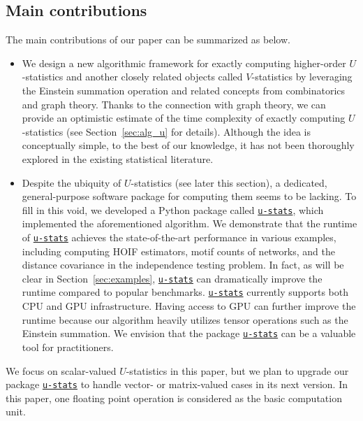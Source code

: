 \documentclass[twoside,11pt]{article}
\newcommand{\libref}[2]{\href{#2}{\texttt{#1}}}
\def\package{\libref{u-stats}{https://github.com/zrq1706/U-Statistics-python}}
\begin{document}
\subsection*{Main contributions}

The main contributions of our paper can be summarized as below.

\begin{itemize}
\item We design a new algorithmic framework for exactly computing higher-order $U$-statistics and another closely related objects called $V$-statistics by leveraging the Einstein summation operation and related concepts from combinatorics and graph theory. Thanks to the connection with graph theory, we can provide an optimistic estimate of the time complexity of exactly computing $U$-statistics (see Section~\ref{sec:alg_u} for details). Although the idea is conceptually simple, to the best of our knowledge, it has not been thoroughly explored in the existing statistical literature.

\item Despite the ubiquity of $U$-statistics (see later this section), a dedicated, general-purpose software package for computing them seems to be lacking. To fill in this void, we developed a Python package called \package{}, which implemented the aforementioned algorithm. We demonstrate that the runtime of \package{} achieves the state-of-the-art performance in various examples, including computing HOIF estimators, motif counts of networks, and the distance covariance in the independence testing problem. In fact, as will be clear in Section~\ref{sec:examples}, \package{} can dramatically improve the runtime compared to popular benchmarks. \package{} currently supports both CPU and GPU infrastructure. Having access to GPU can further improve the runtime because our algorithm heavily utilizes tensor operations such as the Einstein summation. We envision that the package \package{} can be a valuable tool for practitioners.
\end{itemize}

\begin{remark}
\label{rem:misc}
We focus on scalar-valued $U$-statistics in this paper, but we plan to upgrade our package {\normalfont\package{}} to handle vector- or matrix-valued cases in its next version. In this paper, one floating point operation is considered as the basic computation unit.
\end{remark}

\end{document}
